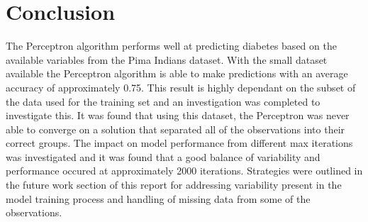 \documentclass[10pt,twocolumn,letterpaper]{article}
\begin{document}
\section{Conclusion}
The Perceptron algorithm performs well at predicting diabetes based on the available variables from the Pima
Indians dataset. With the small dataset available the Perceptron algorithm is able to make predictions with
an average accuracy of approximately 0.75. This result is highly dependant on the subset of the data used
for the training set and an investigation was completed to investigate this. It was found that using this
dataset, the Perceptron was never able to converge on a solution that separated all of the observations into
their correct groups. The impact on model performance from different max iterations was investigated and it
was found that a good balance of variability and performance occured at approximately 2000 iterations.
Strategies were outlined in the future work section of this report for addressing variability present
in the model training process and handling of missing data from some of the observations.
\small


\end{document}
